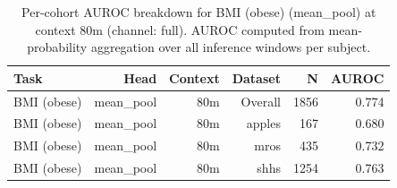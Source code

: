 \begin{table}[ht]
\centering
\caption{Per-cohort AUROC breakdown for BMI (obese) (mean_pool) at context 80m (channel: full). AUROC computed from mean-probability aggregation over all inference windows per subject.}
\label{tab:cohort_bmi_binary_mean_pool_full}
\begin{tabular}{lrrrrr}
\toprule
Task & Head & Context & Dataset & N & AUROC \\
\midrule
BMI (obese) & mean_pool & 80m & Overall & 1856 & 0.774 \\
BMI (obese) & mean_pool & 80m & apples & 167 & 0.680 \\
BMI (obese) & mean_pool & 80m & mros & 435 & 0.732 \\
BMI (obese) & mean_pool & 80m & shhs & 1254 & 0.763 \\
\bottomrule
\end{tabular}
\end{table}